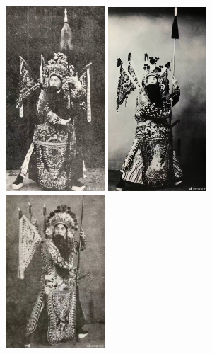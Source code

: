 \documentclass[cjk,slidestop,compress,mathserif,blue]{beamer}
\begin{document}
\frame
{
	\frametitle{}
\begin{figure}[h!]
\centering
\vspace{-0.15in}
\includegraphics[height=0.65\textwidth,width=0.33\textwidth,clip]{Figures/PekOpe_Liu-3.jpg}
\includegraphics[height=0.65\textwidth,width=0.33\textwidth,clip]{Figures/PekOpe_Liu-4.jpg}
\includegraphics[height=0.60\textwidth,width=0.33\textwidth,clip]{Figures/PekOpe_Liu-5.jpg}
\label{Liu_Zengfu-3}
\end{figure}
}
\end{document}
